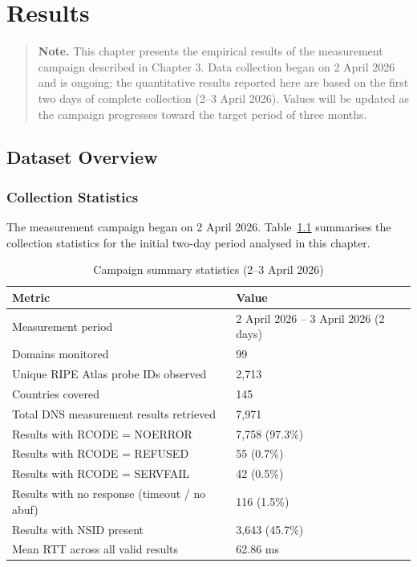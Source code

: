 
\chapter{Results}

\begin{quote}
\textbf{Note.} This chapter presents the empirical results of the measurement campaign described in Chapter 3. Data collection began on 2 April 2026 and is ongoing; the quantitative results reported here are based on the first two days of complete collection (2--3 April 2026). Values will be updated as the campaign progresses toward the target period of three months.
\end{quote}
\bigskip
\section{Dataset Overview}
\label{sec:4.1}

\subsection{Collection Statistics}
\label{subsec:4.1.1}

The measurement campaign began on 2 April 2026. Table~\ref{tab:4.1} summarises the collection statistics for the initial two-day period analysed in this chapter.

\begin{table}[H]
\centering
\small
\caption{Campaign summary statistics (2--3 April 2026)}
\label{tab:4.1}
\begin{tabular}{l l}
\toprule
\textbf{Metric} & \textbf{Value} \\
\midrule
Measurement period & 2 April 2026 -- 3 April 2026 (2 days) \\
Domains monitored & 99 \\
Unique RIPE Atlas probe IDs observed & 2,713 \\
Countries covered & 145 \\
Total DNS measurement results retrieved & 7,971 \\
Results with RCODE = NOERROR & 7,758 (97.3\%) \\
Results with RCODE = REFUSED & 55 (0.7\%) \\
Results with RCODE = SERVFAIL & 42 (0.5\%) \\
Results with no response (timeout / no abuf) & 116 (1.5\%) \\
Results with NSID present & 3,643 (45.7\%) \\
Mean RTT across all valid results & 62.86 ms \\
\bottomrule
\end{tabular}
\end{table}

